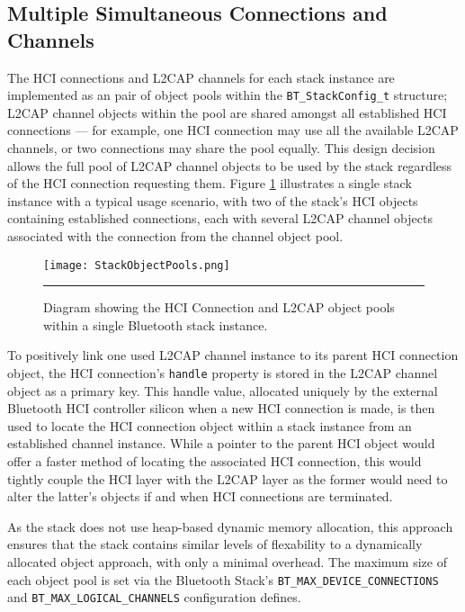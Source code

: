 

\FloatBarrier
\subsection{Multiple Simultaneous Connections and Channels}

The HCI connections and L2CAP channels for each stack instance are implemented as an pair of object pools within the \lstinline{BT_StackConfig_t} structure; L2CAP channel objects within the pool are shared amongst all established HCI connections --- for example, one HCI connection may use all the available L2CAP channels, or two connections may share the pool equally. This design decision allows the full pool of L2CAP channel objects to be used by the stack regardless of the HCI connection requesting them. Figure \ref{fig:stackobjectpools} illustrates a single stack instance with a typical usage scenario, with two of the stack's HCI objects containing established connections, each with several L2CAP channel objects associated with the connection from the channel object pool.

\begin{figure}[tbph]
	\vspace{1em}
	\centering
		\texttt{[image: StackObjectPools.png]}
	\rule{35em}{0.5pt}
	\caption[Diagram of the Bluetooth stack instance object pools]{Diagram showing the HCI Connection and L2CAP object pools within a single Bluetooth stack instance.}
	\label{fig:stackobjectpools}
\end{figure}

To positively link one used L2CAP channel instance to its parent HCI connection object, the HCI connection's \texttt{handle} property is stored in the L2CAP channel object as a primary key. This handle value, allocated uniquely by the external Bluetooth HCI controller silicon when a new HCI connection is made, is then used to locate the HCI connection object within a stack instance from an established channel instance. While a pointer to the parent HCI object would offer a faster method of locating the associated HCI connection, this would tightly couple the HCI layer with the L2CAP layer as the former would need to alter the latter's objects if and when HCI connections are terminated.

As the stack does not use heap-based dynamic memory allocation, this approach ensures that the stack contains similar levels of flexability to a dynamically allocated object approach, with only a minimal overhead. The maximum size of each object pool is set via the Bluetooth Stack's \lstinline{BT_MAX_DEVICE_CONNECTIONS} and \lstinline{BT_MAX_LOGICAL_CHANNELS} configuration defines.

